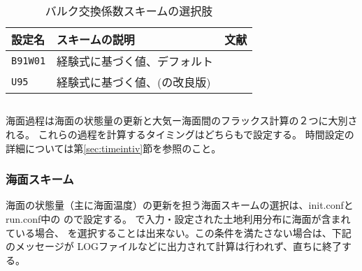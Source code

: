 \begin{table}[h]
\begin{center}
  \caption{バルク交換係数スキームの選択肢}
  \label{tab:nml_bulk}
  \begin{tabularx}{150mm}{llX} \hline
    \rowcolor[gray]{0.9}  設定名 & スキームの説明 & 文献 \\ \hline
      \verb|B91W01| & 経験式に基づく値、デフォルト & \citet{beljaars_1991,wilson_2001} \\
      \verb|U95|    & 経験式に基づく値、(\citet{louis_1979}の改良版) & \citet{uno_1995} \\
    \hline
  \end{tabularx}
\end{center}
\end{table}



\subsection{\SubsecOceanSetting} \label{subsecp:basic_usel_ocean}
海面過程は海面の状態量の更新と大気ー海面間のフラックス計算の２つに大別される。
これらの過程を計算するタイミングはどちらもで設定する。
時間設定の詳細については第\ref{sec:timeintiv}節を参照のこと。\\


\subsubsection{海面スキーム}
海面の状態量（主に海面温度）の更新を担う海面スキームの選択は、init.confとrun.conf中の
ので設定する。
で入力・設定された土地利用分布に海面が含まれている場合、
を選択することは出来ない。この条件を満たさない場合は、下記のメッセージが
LOGファイルなどに出力されて計算は行われず、直ちに終了する。

\\

\\

